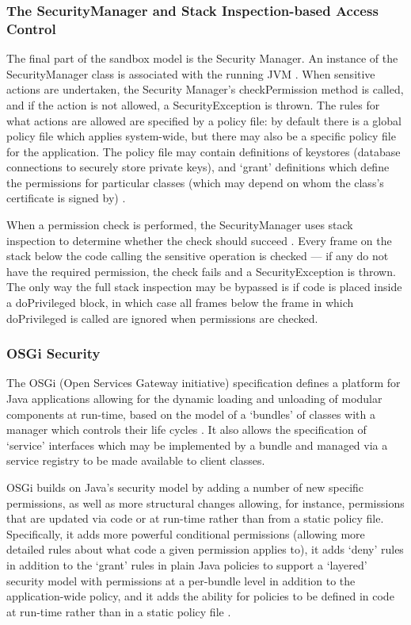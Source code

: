 \subsubsection{The SecurityManager and Stack Inspection-based Access Control}

The final part of the sandbox model is the Security Manager. An instance of the SecurityManager class is associated with the running JVM \cite{gosling2014java}. When sensitive actions are undertaken, the Security Manager's checkPermission method is called, and if the action is not allowed, a SecurityException is thrown. The rules for what actions are allowed are specified by a policy file: by default there is a global policy file which applies system-wide, but there may also be a specific policy file for the application. The policy file may contain definitions of keystores (database connections to securely store private keys), and `grant' definitions which define the permissions for particular classes (which may depend on whom the class's certificate is signed by) \cite{gosling2014java}.

When a permission check is performed, the SecurityManager uses stack inspection to determine whether the check should succeed \cite{gong2003javasecurity}. Every frame on the stack below the code calling the sensitive operation is checked --- if any do not have the required permission, the check fails and a SecurityException is thrown. The only way the full stack inspection may be bypassed is if code is placed inside a doPrivileged block, in which case \cite{gong2003javasecurity} all frames below the frame in which doPrivileged is called are ignored when permissions are checked.


\subsubsection{OSGi Security}

The OSGi (Open Services Gateway initiative) specification defines a platform for Java applications allowing for the dynamic loading and unloading of modular components at run-time, based on the model of a `bundles' of classes with a manager which controls their life cycles \cite{osgi2014osgi}. It also allows the specification of `service' interfaces which may be implemented by a bundle and managed via a service registry to be made available to client classes.

OSGi builds on Java's security model by adding a number of new specific permissions, as well as more structural changes allowing, for instance, permissions that are updated via code or at run-time rather than from a static policy file. Specifically, it adds more powerful conditional permissions (allowing more detailed rules about what code a given permission applies to), it adds `deny' rules in addition to the `grant' rules in plain Java policies to support a `layered' security model with permissions at a per-bundle level in addition to the application-wide policy, and it adds the ability for policies to be defined in code at run-time rather than in a static policy file \cite{hall2011osgi}.